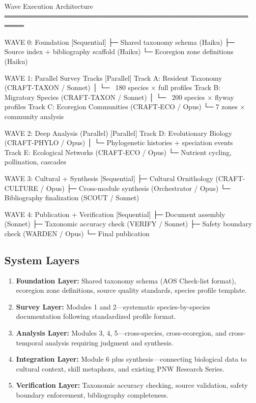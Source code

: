 \documentclass[11pt,letterpaper]{article}
\begin{document}
\begin{asciibox}
Wave Execution Architecture
══════════════════════════════════════════════════════

WAVE 0: Foundation                        [Sequential]
  ├─ Shared taxonomy schema (Haiku)
  ├─ Source index + bibliography scaffold (Haiku)
  └─ Ecoregion zone definitions (Haiku)

WAVE 1: Parallel Survey Tracks            [Parallel]
  Track A: Resident Taxonomy (CRAFT-TAXON / Sonnet)
  │  └─ ~180 species × full profiles
  Track B: Migratory Species (CRAFT-TAXON / Sonnet)
  │  └─ ~200 species × flyway profiles
  Track C: Ecoregion Communities (CRAFT-ECO / Opus)
     └─ 7 zones × community analysis

WAVE 2: Deep Analysis (Parallel)          [Parallel]
  Track D: Evolutionary Biology (CRAFT-PHYLO / Opus)
  │  └─ Phylogenetic histories + speciation events
  Track E: Ecological Networks (CRAFT-ECO / Opus)
     └─ Nutrient cycling, pollination, cascades

WAVE 3: Cultural + Synthesis              [Sequential]
  ├─ Cultural Ornithology (CRAFT-CULTURE / Opus)
  ├─ Cross-module synthesis (Orchestrator / Opus)
  └─ Bibliography finalization (SCOUT / Sonnet)

WAVE 4: Publication + Verification        [Sequential]
  ├─ Document assembly (Sonnet)
  ├─ Taxonomic accuracy check (VERIFY / Sonnet)
  ├─ Safety boundary check (WARDEN / Opus)
  └─ Final publication
\end{asciibox}

\subsection{System Layers}

\begin{enumerate}[leftmargin=2em]
\item \textbf{Foundation Layer:} Shared taxonomy schema (AOS Check-list format), ecoregion zone definitions, source quality standards, species profile template.
\item \textbf{Survey Layer:} Modules 1 and 2---systematic species-by-species documentation following standardized profile format.
\item \textbf{Analysis Layer:} Modules 3, 4, 5---cross-species, cross-ecoregion, and cross-temporal analysis requiring judgment and synthesis.
\item \textbf{Integration Layer:} Module 6 plus synthesis---connecting biological data to cultural context, skill metaphors, and existing PNW Research Series.
\item \textbf{Verification Layer:} Taxonomic accuracy checking, source validation, safety boundary enforcement, bibliography completeness.
\end{enumerate}
\end{document}
